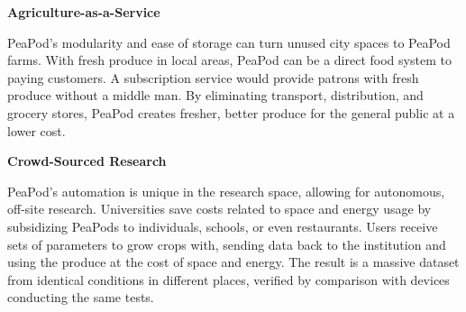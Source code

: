\documentclass{report}
\begin{document}


\textbf{Agriculture-as-a-Service}

PeaPod’s modularity and ease of storage can turn unused city spaces to PeaPod farms. With fresh produce in local areas, PeaPod can be a direct food system to paying customers. A subscription service would provide patrons with fresh produce without a middle man. By eliminating transport, distribution, and grocery stores, PeaPod creates fresher, better produce for the general public at a lower cost.

\textbf{Crowd-Sourced Research}

PeaPod's automation is unique in the research space, allowing for autonomous, off-site research. Universities save costs related to space and energy usage by subsidizing PeaPods to individuals, schools, or even restaurants. Users receive sets of parameters to grow crops with, sending data back to the institution and using the produce at the cost of space and energy. The result is a massive dataset from identical conditions in different places, verified by comparison with devices conducting the same tests.
\end{document}

